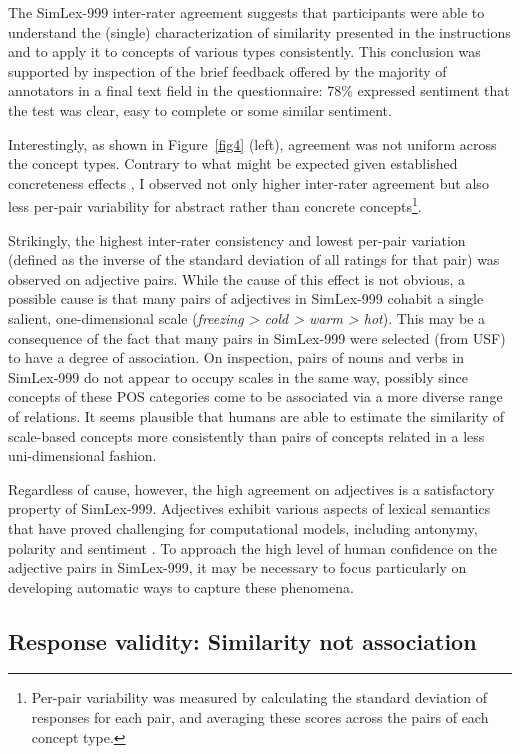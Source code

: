 The SimLex-999 inter-rater agreement suggests that participants were able to understand the (single) characterization of similarity presented in the instructions and to apply it to concepts of various types consistently. This conclusion was supported by inspection of the brief feedback offered by the majority of annotators in a final text field in the questionnaire: 78\% expressed sentiment that the test was clear, easy to complete or some similar sentiment.

Interestingly, as shown in Figure~\ref{fig4} (left), agreement was not uniform across the concept types. Contrary to what might be expected given established concreteness effects \citep{paivio1991dual}, I observed not only higher inter-rater agreement but also less per-pair variability for abstract rather than concrete concepts\footnote{Per-pair variability was measured by calculating the standard deviation of responses for each pair, and averaging these scores across the pairs of each concept type.}. 

Strikingly, the highest inter-rater consistency and lowest per-pair variation (defined as the inverse of the standard deviation of all ratings for that pair) was observed on adjective pairs. While the cause of this effect is not obvious, a possible cause is that many pairs of adjectives in SimLex-999 cohabit a single salient, one-dimensional scale (\emph{freezing > cold > warm > hot}). This may be a consequence of the fact that many pairs in SimLex-999 were selected (from USF) to have a degree of association. On inspection, pairs of nouns and verbs in SimLex-999 do not appear to occupy scales in the same way, possibly since concepts of these POS categories come to be associated via a more diverse range of relations. It seems plausible that humans are able to estimate the similarity of scale-based concepts more consistently than pairs of concepts related in a less uni-dimensional fashion. 

Regardless of cause, however, the high agreement on adjectives is a satisfactory property of SimLex-999. Adjectives exhibit various aspects of lexical semantics that have proved challenging for computational models, including antonymy, polarity \citep{williams2009predicting} and sentiment \citep{wiebe2000learning}. To approach the high level of human confidence on the adjective pairs in SimLex-999, it may be necessary to focus particularly on developing automatic ways to capture these phenomena. 

\subsection{Response validity: Similarity not association}	




